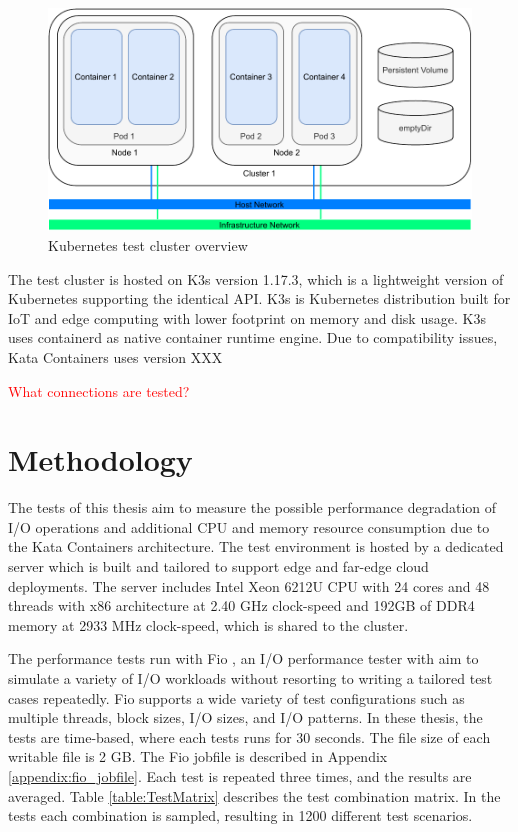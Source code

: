 \begin{figure}[ht]
  \begin{center}
    \includegraphics[width=13.5cm]{images/TestArchitectureCluster.pdf}
    \caption{Kubernetes test cluster overview}
    \label{fig:TestArchitectureCluster}
  \end{center}
\end{figure}

The test cluster is hosted on K3s\cite{K3s} version 1.17.3, which is a lightweight version of Kubernetes supporting the identical API. K3s is Kubernetes distribution built for IoT and edge computing with lower footprint on memory and disk usage. K3s uses containerd as native container runtime engine. Due to compatibility issues, Kata Containers uses version XXX

\textcolor{red}{What connections are tested?}


\section{Methodology}

The tests of this thesis aim to measure the possible performance degradation of I/O operations and additional CPU and memory resource consumption due to the Kata Containers architecture. The test environment is hosted by a dedicated server which is built and tailored to support edge and far-edge cloud deployments. The server includes Intel Xeon 6212U CPU with 24 cores and 48 threads with x86 architecture at 2.40 GHz clock-speed and 192GB of DDR4 memory at 2933 MHz clock-speed, which is shared to the cluster.

The performance tests run with Fio \cite{FIO}, an I/O performance tester with aim to simulate a variety of I/O workloads without resorting to writing a tailored test cases repeatedly. Fio supports a wide variety of test configurations such as multiple threads, block sizes, I/O sizes, and I/O patterns. In these thesis, the tests are time-based, where each tests runs for 30 seconds. The file size of each writable file is 2 GB. The Fio jobfile is described in Appendix \ref{appendix:fio_jobfile}. Each test is repeated three times, and the results are averaged. Table \ref{table:TestMatrix} describes the test combination matrix. In the tests each combination is sampled, resulting in 1200 different test scenarios. 

